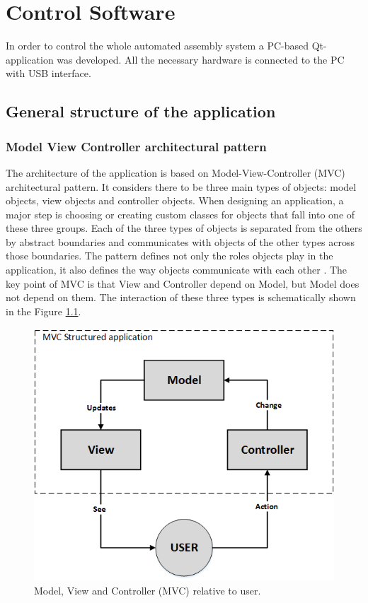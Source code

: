 \chapter{Control Software}

In order to control the whole automated assembly system a PC-based Qt-application was developed. All the necessary hardware is connected to the PC with USB interface.

\section{General structure of the application}

\subsection{Model View Controller architectural pattern}

The architecture of the application is based on Model-View-Controller (MVC) architectural pattern. It considers there to be three main types of objects: model objects, view objects and controller objects. When designing an application, a major step is choosing or creating custom classes for objects that fall into one of these three groups. Each of the three types of objects is separated from the others by abstract boundaries and communicates with objects of the other types across those boundaries. The pattern defines not only the roles objects play in the application, it also defines the way objects communicate with each other \cite{apple_MVC}. The key point of MVC is that View and Controller depend on Model, but Model does not depend on them. The  interaction of these three types is schematically shown in the Figure \ref{fig:mvc_general}.

\begin{figure}[ht]\centering
\includegraphics[width=0.7\linewidth]{Data/Control_Software/MVC_general.png}
\caption{Model, View and Controller (MVC) relative to user.}
\label{fig:mvc_general}
\end{figure}

